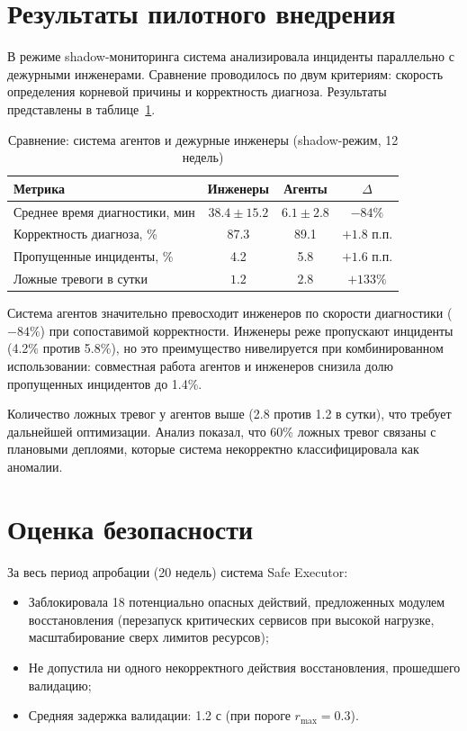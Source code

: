 \section{Результаты пилотного внедрения}

В режиме shadow-мониторинга система анализировала инциденты параллельно с дежурными инженерами. Сравнение проводилось по двум критериям: скорость определения корневой причины и корректность диагноза. Результаты представлены в таблице~\ref{tab:shadow_comparison}.

\begin{table}[H]
\centering
\caption{Сравнение: система агентов и дежурные инженеры (shadow-режим, 12 недель)}
\label{tab:shadow_comparison}
\begin{tabular}{|p{4.5cm}|c|c|c|}
\hline
\textbf{Метрика} & \textbf{Инженеры} & \textbf{Агенты} & \textbf{$\Delta$} \\
\hline
Среднее время диагностики, мин & $38.4 \pm 15.2$ & $6.1 \pm 2.8$ & $-84\%$ \\
\hline
Корректность диагноза, \% & 87.3 & 89.1 & $+1.8$ п.п. \\
\hline
Пропущенные инциденты, \% & 4.2 & 5.8 & $+1.6$ п.п. \\
\hline
Ложные тревоги в сутки & $1.2$ & $2.8$ & $+133\%$ \\
\hline
\end{tabular}
\end{table}

Система агентов значительно превосходит инженеров по скорости диагностики ($-84\%$) при сопоставимой корректности. Инженеры реже пропускают инциденты (4.2\% против 5.8\%), но это преимущество нивелируется при комбинированном использовании: совместная работа агентов и инженеров снизила долю пропущенных инцидентов до 1.4\%.

Количество ложных тревог у агентов выше (2.8 против 1.2 в сутки), что требует дальнейшей оптимизации. Анализ показал, что 60\% ложных тревог связаны с плановыми деплоями, которые система некорректно классифицировала как аномалии.

\section{Оценка безопасности}

За весь период апробации (20 недель) система Safe Executor:

\begin{itemize}
    \item Заблокировала 18 потенциально опасных действий, предложенных модулем восстановления (перезапуск критических сервисов при высокой нагрузке, масштабирование сверх лимитов ресурсов);
    \item Не допустила ни одного некорректного действия восстановления, прошедшего валидацию;
    \item Средняя задержка валидации: 1.2 с (при пороге $r_{\max} = 0.3$).
\end{itemize}
